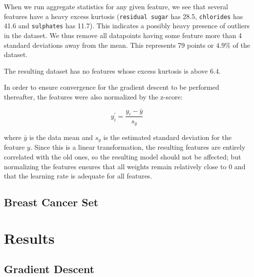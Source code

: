 \documentclass[11pt,letterpaper]{article}
\begin{document}
    When we run aggregate statistics for any given feature, we see that several features have a heavy excess kurtosis (\texttt{residual sugar} has 28.5, \texttt{chlorides} has 41.6 and \texttt{sulphates} has 11.7). This indicates a possibly heavy presence of outliers in the dataset. We thus remove all datapoints having some feature more than 4 standard deviations away from the mean. This represents 79 points or $4.9\%$ of the dataset.
    
    The resulting dataset has no features whose excess kurtosis is above 6.4.
    
    In order to ensure convergence for the gradient descent to be performed thereafter, the features were also normalized by the z-score:
    
    $$y_i^\prime = \frac{y_i - \bar{y}}{s_y}$$
    
    where $\bar{y}$ is the data mean and $s_y$ is the estimated standard deviation for the feature $y$. Since this is a linear transformation, the resulting features are entirely correlated with the old ones, so the resulting model should not be affected; but normalizing the features ensures that all weights remain relatively close to 0 and that the learning rate is adequate for all features.
    
    \subsection{Breast Cancer Set}
    
    
    
    \section{Results}
    
    \subsection{Gradient Descent}
    
\end{document}
